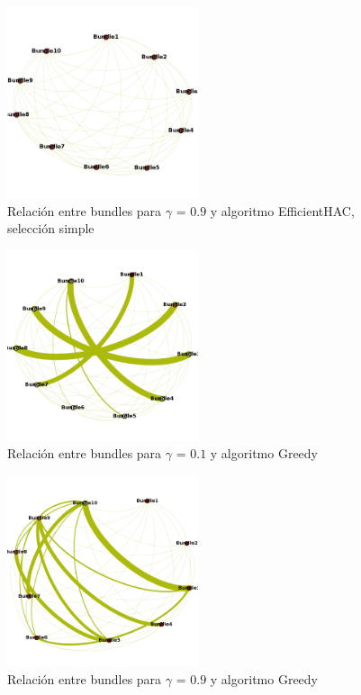 \begin{figure}[H]
  \centering
    \includegraphics[width=0.5\textwidth]{resultados/authors/intra_inter/effhac09.png}
  \caption{Relación entre bundles para $\gamma$ = $0.9$ y algoritmo EfficientHAC, selección simple}
  \label{res:img-authors-gamma09-effhac}
\end{figure}

\begin{figure}[H]
  \centering
    \includegraphics[width=0.5\textwidth]{resultados/authors/intra_inter/greedy01.png}
  \caption{Relación entre bundles para $\gamma$ = $0.1$ y algoritmo Greedy}
  \label{res:img-authors-gamma01-greedy}
\end{figure}

\begin{figure}[H]
  \centering
    \includegraphics[width=0.5\textwidth]{resultados/authors/intra_inter/greedy09.png}
  \caption{Relación entre bundles para $\gamma$ = $0.9$ y algoritmo Greedy}
  \label{res:img-authors-gamma09-greedy}
\end{figure}

